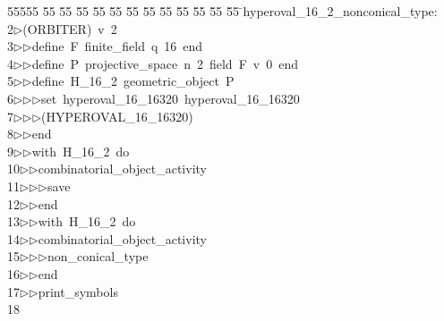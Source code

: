 %
%
\begin{tabbing}
55555 \= 55 \= 55 \= 55 \= 55 \= 55 \= 55 \= 55 \= 55 \= 55 \= 55 \= 55 \= 55 \= \>hyperoval\_16\_2\_nonconical\_type:\\[0pt]
2\>$\triangleright$\>(ORBITER)\ v\ 2\ \\[0pt]
3\>$\triangleright$\>$\triangleright$\>define\ F\ finite\_field\ q\ 16\ end\ \\[0pt]
4\>$\triangleright$\>$\triangleright$\>define\ P\ projective\_space\ n\ 2\ field\ F\ v\ 0\ end\ \\[0pt]
5\>$\triangleright$\>$\triangleright$\>define\ H\_16\_2\ geometric\_object\ P\ \\[0pt]
6\>$\triangleright$\>$\triangleright$\>$\triangleright$\>set\ hyperoval\_16\_16320\ hyperoval\_16\_16320\ \\[0pt]
7\>$\triangleright$\>$\triangleright$\>$\triangleright$\>(HYPEROVAL\_16\_16320)\ \\[0pt]
8\>$\triangleright$\>$\triangleright$\>end\ \\[0pt]
9\>$\triangleright$\>$\triangleright$\>with\ H\_16\_2\ do\ \\[0pt]
10\>$\triangleright$\>$\triangleright$\>combinatorial\_object\_activity\ \\[0pt]
11\>$\triangleright$\>$\triangleright$\>$\triangleright$\>save\ \\[0pt]
12\>$\triangleright$\>$\triangleright$\>end\ \\[0pt]
13\>$\triangleright$\>$\triangleright$\>with\ H\_16\_2\ do\ \\[0pt]
14\>$\triangleright$\>$\triangleright$\>combinatorial\_object\_activity\ \\[0pt]
15\>$\triangleright$\>$\triangleright$\>$\triangleright$\>non\_conical\_type\ \\[0pt]
16\>$\triangleright$\>$\triangleright$\>end\ \\[0pt]
17\>$\triangleright$\>$\triangleright$\>print\_symbols\\[0pt]
18\>\end{tabbing}
